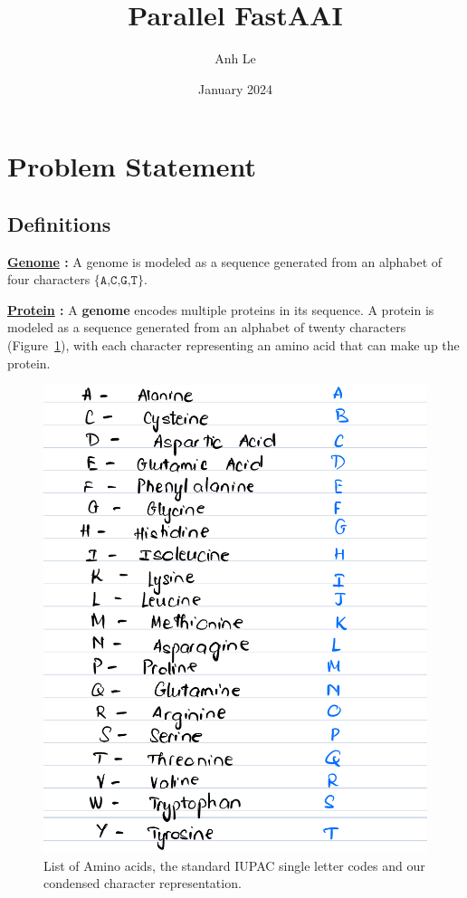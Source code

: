 \documentclass{article}[11pt]
\title{Parallel FastAAI}
\author{Anh Le }
\date{January 2024}
\begin{document}
    
\maketitle

\section{Problem Statement}
\subsection{Definitions}

\textbf{\underline{Genome} :} A genome is modeled as a sequence generated from an alphabet of four characters $\{\texttt{A,C,G,T}\}$. 

\noindent \textbf{\underline{Protein} :} A \textbf{genome} encodes multiple proteins in its sequence.
A protein is modeled as a sequence generated from an alphabet of twenty characters (Figure~\ref{fig:amino-acids}), with each character representing an amino acid that can make up the protein.

\begin{figure}
    \centering
\includegraphics[width=\textwidth]{figures/Amino_Acid_Condensed_Form.jpg}
    \caption{List of Amino acids, the standard IUPAC single letter codes and our condensed character representation.}
    \label{fig:amino-acids}
\end{figure}
\end{document}

